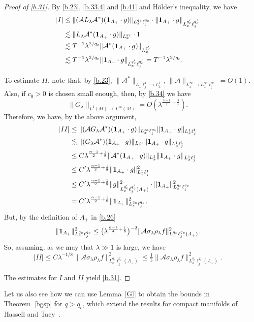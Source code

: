 \documentclass[10pt]{amsart}
\newcommand{\la}{\lambda}
\renewcommand{\l}{\lambda}
\newcommand{\1}{{\bf 1}}
\newcommand{\A}{{\mathcal A}}
\begin{document}
\begin{proof}[Proof of \eqref{b.31}]
By \eqref{b.23}, \eqref{b.33.4} and \eqref{b.41} and
H\"older's inequality, we have
\begin{align*}
|I|&\le
\|(\A L_\la \A^*)(\1_{A_+}\cdot g)
\|_{L^{q_c}_x\ell_j^{q_c}}
\cdot \|\1_{A_+}\cdot g
\|_{L^{q_c'}_x\ell^{q_c'}_j}
\\
&\lesssim \|L_\la \A^*(\1_{A_+}\cdot g)
\|_{L^{q_c}_x}\cdot 1
\\
&\lesssim T^{-1}\la^{2/q_c}\|\A^*(\1_{A_+}\cdot
g)\|_{L^{q_c'}_x}
\\
&\lesssim T^{-1}\la^{2/q_c}\|\1_{A_+}\cdot g
\|_{L^{q_c'}_x\ell^{q_c'}_j}=T^{-1}\la^{2/q_c}.
\end{align*}


To estimate $II$, note that, by \eqref{b.23},
$\|\A^*\|_{L^1_x\ell^1_j\to L^1_x}, 
\, \|\A\|_{L^\infty_x\to L^\infty_x\ell_j^\infty}
=O(1)$.
Also, if $c_0>0$ is chosen small enough, then,
by \eqref{b.34} we have
$$\|G_\la\|_{L^1(M)\to L^\infty(M)}=O(\la^{\frac{n-1}2
+\frac18}).$$
 Therefore, we have, by the above argument,
\begin{align*}
|II|&
\le
\|(\A G_\la \A^*)(\1_{A_+}\cdot g)\|_{L^\infty_x
\ell^\infty_j}\|\1_{A_+}\cdot g
\|_{L^1_x\ell_j^1}
\\
&
\lesssim \|( G_\la \A^*)(\1_{A_+}\cdot g)\|_{L^\infty_x}\|\1_{A_+}\cdot g
\|_{L^1_x\ell_j^1}
\\
&\le C
\la^{\frac{n-1}2+\frac18}\|\A^*(\1_{A_+}\cdot g)
\|_{L^1_x}\|\1_{A_+}\cdot g\|_{L^1_x\ell^1_j}
\\
&\le C'\la^{\frac{n-1}2+\frac18} \|\1_{A_+}\cdot g\|_{L^1_x\ell^1_j}^2
\\
&\le C' \la^{\frac{n-1}2+\frac18}
\| g\|^2_{L^{q_c'}_x\ell^{q_c'}_j(A_+)}
\cdot \|\1_{A_+}\|^2_{L^{q_c}_x\ell^{q_c}_j}
\\
&=C' \la^{\frac{n-1}2+\frac18} \|\1_{A_+}\|^2_{L^{q_c}_x\ell^{q_c}_j}.
\end{align*}
But, by the definition of $A_+$ in \eqref{b.26}
$$\|\1_{A_+}\|^2_{L^{q_c}_x \ell^{q_c}_j}
\le \bigl(\la^{\frac{n-1}4+\frac18}\bigr)^{-2}
\|\A \sigma_\la \rho_\la f\|^2_{L^{q_c}_x\ell^{q_c}_j
(A_+)}.$$
So, assuming, as we may that $\l\gg 1$ is large,
we have
$$|II|\le C\la^{-1/8}
\|\A\sigma_\la \rho_\la f\|^2_{L^{q_c}_x\ell^{q_c}_j
(A_+)}
\le \tfrac12 \|\A\sigma_\la \rho_\la f\|^2_{L^{q_c}_x\ell^{q_c}_j
(A_+)}.$$


The estimates for $I$ and $II$ yield \eqref{b.31}.
\end{proof}




Let us also see how we can use Lemma~\ref{Gl} to
obtain the bounds in Theorem~\ref{bgsp} for 
$q>q_c$, which extend the results for compact
manifolds of Hassell and Tacy~\cite{HassellTacy}.
\end{document}
